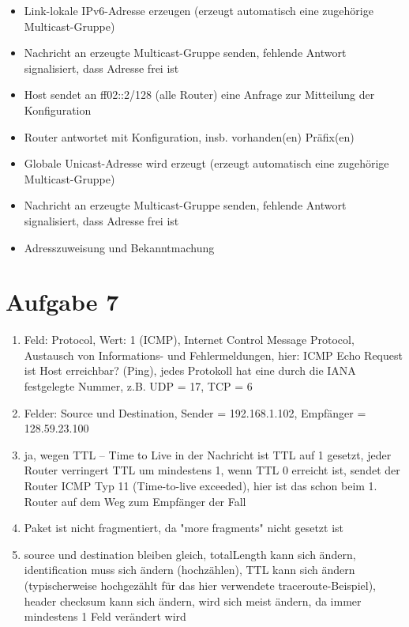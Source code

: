 \documentclass{article}
\begin{document}
\begin{enumerate}[label=(\alph*)]
		\begin{itemize}
			\item Link-lokale IPv6-Adresse erzeugen (erzeugt automatisch eine zugehörige Multicast-Gruppe)
			\item Nachricht an erzeugte Multicast-Gruppe senden, fehlende Antwort signalisiert, dass Adresse frei ist
			\item Host sendet an ff02::2/128 (alle Router) eine Anfrage zur Mitteilung der Konfiguration
			\item Router antwortet mit Konfiguration, insb. vorhanden(en) Präfix(en)
			\item Globale Unicast-Adresse wird erzeugt (erzeugt automatisch eine zugehörige Multicast-Gruppe)
			\item Nachricht an erzeugte Multicast-Gruppe senden, fehlende Antwort signalisiert, dass Adresse frei ist
			\item Adresszuweisung und Bekanntmachung
		\end{itemize}
	\end{enumerate}

	\section*{Aufgabe 7}
	\begin{enumerate}[label=(\alph*)]
		\item Feld: Protocol, Wert: 1 (ICMP), Internet Control Message Protocol, Austausch von Informations- und Fehlermeldungen, hier: ICMP Echo Request  ist Host erreichbar? (Ping), jedes Protokoll hat eine durch die IANA festgelegte Nummer, z.B. UDP = 17, TCP = 6
		\item Felder: Source und Destination,  Sender = 192.168.1.102, Empfänger = 128.59.23.100
		\item ja, wegen TTL – Time to Live in der Nachricht ist TTL auf 1 gesetzt, jeder Router verringert TTL um mindestens 1, wenn TTL 0 erreicht ist, sendet der Router ICMP Typ 11 (Time-to-live exceeded), hier ist das schon beim 1. Router auf dem Weg zum Empfänger der Fall
		\item Paket ist nicht fragmentiert, da "more fragments" nicht gesetzt ist
		\item source und destination bleiben gleich, totalLength kann sich ändern, identification muss sich ändern (hochzählen), TTL kann sich ändern (typischerweise hochgezählt für das hier verwendete traceroute-Beispiel), header checksum kann sich ändern, wird sich meist ändern, da immer mindestens 1 Feld verändert wird
	\end{enumerate}
	
\end{document}
